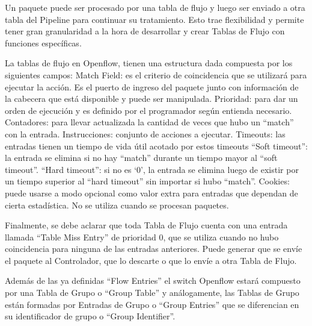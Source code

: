 \documentclass[12pt,a4paper,oneside]{book}
\begin{document}
Un paquete puede ser procesado por una tabla de flujo y luego ser enviado a otra tabla del Pipeline para continuar su tratamiento. Esto trae flexibilidad y permite tener gran granularidad a la hora de desarrollar y crear Tablas de Flujo con funciones específicas.

La tablas de flujo en Openflow, tienen una estructura dada compuesta por los siguientes campos:
Match Field: es el criterio de coincidencia que se utilizará para ejecutar la acción. Es el puerto de ingreso del paquete junto con información de la cabecera que está disponible y puede ser manipulada.
Prioridad: para dar un orden de ejecución y es definido por el programador según entienda necesario.
Contadores: para llevar actualizada la cantidad de veces que hubo un “match” con la entrada.
Instrucciones: conjunto de acciones a ejecutar. 
Timeouts: las entradas tienen un tiempo de vida útil acotado por estos timeouts
“Soft timeout”: la entrada se elimina si no hay “match” durante un tiempo mayor al “soft timeout”.
“Hard timeout”: si no es ‘0’, la entrada se elimina luego de existir por un tiempo superior al “hard timeout” sin importar si hubo “match”.
Cookies: puede usarse a modo opcional como valor extra para entradas que dependan de cierta estadística. No se utiliza cuando se procesan paquetes.
	
	Finalmente, se debe aclarar que toda Tabla de Flujo cuenta con una entrada llamada “Table Miss Entry” de prioridad 0, que se utiliza cuando no hubo coincidencia para ninguna de las entradas anteriores. Puede generar que se envíe el paquete al Controlador, que lo descarte o que lo envíe a otra Tabla de Flujo.

	Además de las ya definidas “Flow Entries” el switch Openflow estará compuesto por una Tabla de Grupo o “Group Table” y análogamente, las Tablas de Grupo están formadas por Entradas de Grupo o “Group Entries” que se diferencian en su identificador de grupo o “Group Identifier”.
	
\end{document}
